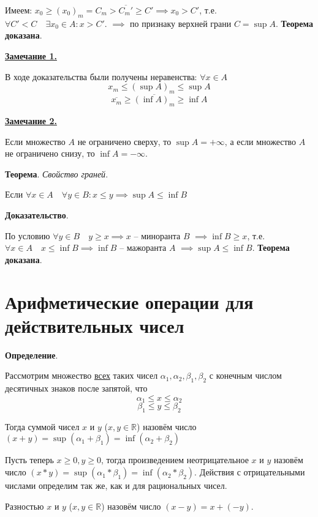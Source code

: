 \documentclass{article}
\newcommand{\parspace}{\vspace{10pt}}
\begin{document}
Имеем: $x_0 \ge (x_0)_m = C_m > \overline{C_m'} \ge C' \implies x_0 > C'$,
т.е. $\forall C' < C \quad \exists x_0 \in A: x > C'$.
$\implies$ по признаку верхней грани $C = \sup A$. \textbf{Теорема доказана}.

\parspace

\underline{\textbf{Замечание 1.}}

В ходе доказательства были получены неравенства: $\forall x \in A$
\[x_m \le (\sup A)_m \le \sup A\]
\[\overline{x_m} \ge \overline{(\inf A)_m} \ge \inf A\]

\parspace

\underline{\textbf{Замечание 2.}}

Если множество $A$ не ограничено сверху, то $\sup A = + \infty$, а если множество $A$
не ограничено снизу, то $\inf A = - \infty$.

\parspace

\textbf{Теорема}. \textit{Свойство граней}.

Если $\forall x \in A \quad \forall y \in B: x \le y \implies \sup A \le \inf B$

\textbf{Доказательство}.

По условию $\forall y \in B \quad y \ge x \implies x$ -- миноранта $B$
$\implies \inf B \ge x$, т.е. $\forall x \in A \quad x \le \inf B \implies \inf B$ --
мажоранта $A$ $\implies \sup A \le \inf B$. \textbf{Теорема доказана}.

\section{Арифметические операции для действительных чисел}

\textbf{Определение}.

Рассмотрим множество \underline{всех} таких чисел
$\alpha_1, \alpha_2, \beta_1, \beta_2$ с конечным числом десятичных знаков
после запятой, что
\[\alpha_1 \le x \le \alpha_2\]
\[\beta_1 \le y \le \beta_2\]

Тогда суммой чисел $x$ и $y$ ($x, y \in \mathbb{R}$) назовём число 
$(x + y) = \sup (\alpha_1 + \beta_1) = \inf (\alpha_2 + \beta_2)$

Пусть теперь $x \ge 0, y \ge 0$, тогда произведением неотрицательное $x$ и $y$
назовём число $(x * y) = \sup (\alpha_1 * \beta_1) = \inf (\alpha_2 * \beta_2)$.
Действия с отрицательными числами определим так же, как и для рациональных чисел.

Разностью $x$ и $y$ ($x, y \in \mathbb{R}$) назовём число $(x - y) = x + (-y)$.
\end{document}

